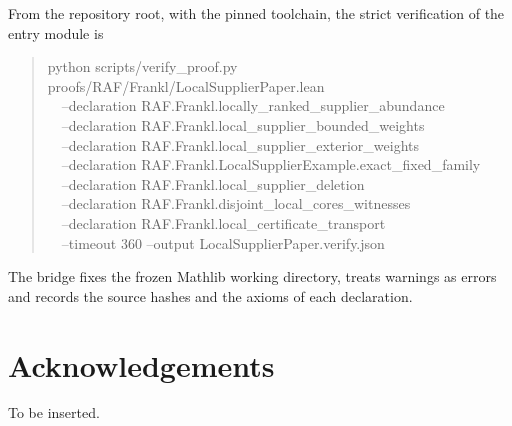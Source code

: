 \documentclass[11pt,a4paper]{article}
\theoremstyle{plain}
\theoremstyle{definition}
\theoremstyle{remark}
\begin{document}
From the repository root, with the pinned toolchain, the strict verification of the entry module is
\begin{quote}\small\ttfamily
python scripts/verify\_proof.py proofs/RAF/Frankl/LocalSupplierPaper.lean\\
\ \ --declaration RAF.Frankl.locally\_ranked\_supplier\_abundance\\
\ \ --declaration RAF.Frankl.local\_supplier\_bounded\_weights\\
\ \ --declaration RAF.Frankl.local\_supplier\_exterior\_weights\\
\ \ --declaration RAF.Frankl.LocalSupplierExample.exact\_fixed\_family\\
\ \ --declaration RAF.Frankl.local\_supplier\_deletion\\
\ \ --declaration RAF.Frankl.disjoint\_local\_cores\_witnesses\\
\ \ --declaration RAF.Frankl.local\_certificate\_transport\\
\ \ --timeout 360 --output LocalSupplierPaper.verify.json
\end{quote}
The bridge fixes the frozen Mathlib working directory, treats warnings as errors and records the source hashes and the axioms of each declaration.

\section*{Acknowledgements}
To be inserted.



\end{document}
